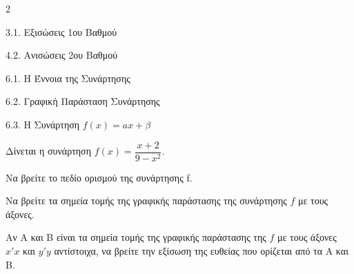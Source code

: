 \begin{ylh}{2}
    \item 3.1. Εξισώσεις 1ου Βαθμού
    \item 4.2. Ανισώσεις 2ου Βαθμού
    \item 6.1. Η Έννοια της Συνάρτησης
    \item 6.2. Γραφική Παράσταση Συνάρτησης
    \item 6.3. Η Συνάρτηση $f(x)=ax+\beta$
\end{ylh}
Δίνεται η συνάρτηση $f(x) = \dfrac{x + 2}{9 - x^2}$.

\begin{alist}
\item Να βρείτε το πεδίο ορισμού της συνάρτησης f.
\item Να βρείτε τα σημεία τομής της γραφικής παράστασης της συνάρτησης $f$ με τους άξονες.
\item Αν Α και Β είναι τα σημεία τομής της γραφικής παράστασης της $f$ με τους άξονες $x'x$ και $y'y$ αντίστοιχα, να βρείτε την εξίσωση της ευθείας που ορίζεται από τα Α και Β.
\end{alist}

